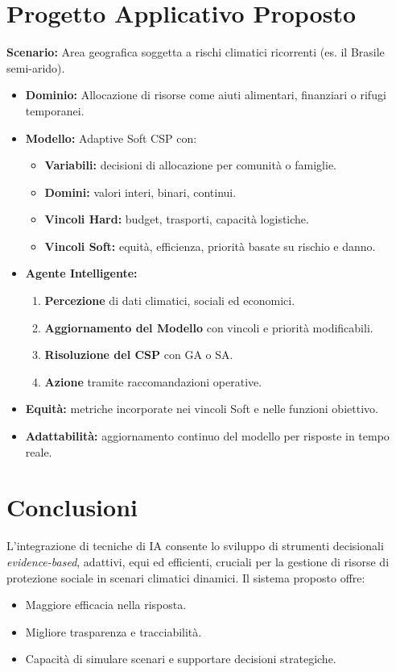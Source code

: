 \documentclass[a4paper,12pt]{article}
\begin{document}
\section*{Progetto Applicativo Proposto}

\textbf{Scenario:} Area geografica soggetta a rischi climatici ricorrenti (es. il Brasile semi-arido).

\begin{itemize}
    \item \textbf{Dominio:} Allocazione di risorse come aiuti alimentari, finanziari o rifugi temporanei.
    \item \textbf{Modello:} Adaptive Soft CSP con:
        \begin{itemize}
            \item \textbf{Variabili:} decisioni di allocazione per comunità o famiglie.
            \item \textbf{Domini:} valori interi, binari, continui.
            \item \textbf{Vincoli Hard:} budget, trasporti, capacità logistiche.
            \item \textbf{Vincoli Soft:} equità, efficienza, priorità basate su rischio e danno.
        \end{itemize}
    \item \textbf{Agente Intelligente:}
        \begin{enumerate}[label=\alph*)]
            \item \textbf{Percezione} di dati climatici, sociali ed economici.
            \item \textbf{Aggiornamento del Modello} con vincoli e priorità modificabili.
            \item \textbf{Risoluzione del CSP} con GA o SA.
            \item \textbf{Azione} tramite raccomandazioni operative.
        \end{enumerate}
    \item \textbf{Equità:} metriche incorporate nei vincoli Soft e nelle funzioni obiettivo.
    \item \textbf{Adattabilità:} aggiornamento continuo del modello per risposte in tempo reale.
\end{itemize}

\section*{Conclusioni}
L’integrazione di tecniche di IA consente lo sviluppo di strumenti decisionali \textit{evidence-based}, adattivi, equi ed efficienti, cruciali per la gestione di risorse di protezione sociale in scenari climatici dinamici. Il sistema proposto offre:

\begin{itemize}
    \item Maggiore efficacia nella risposta.
    \item Migliore trasparenza e tracciabilità.
    \item Capacità di simulare scenari e supportare decisioni strategiche.
\end{itemize}
\end{document}
